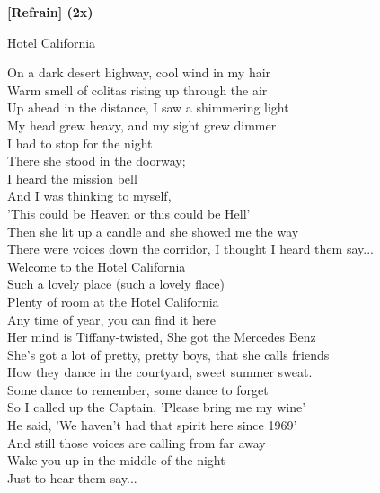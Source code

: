 \documentclass{novel}
\begin{document}
{{\begin{minipage}[t][0.4\textheight][t]{\textwidth}
\begin{multicols}{2}
\textbf{[Refrain] (2x)}

\end{multicols}
\end{minipage}

\nointerlineskip
\begin{minipage}[b][0.55\textheight][t]{\textwidth}
\vspace{0.12\textheight}
\h*{Hotel California}

\begin{multicols}{2}
On a dark desert highway, cool wind in my hair\\
Warm smell of colitas rising up through the air\\
Up ahead in the distance, I saw a shimmering light\\
My head grew heavy, and my sight grew dimmer\\
I had to stop for the night\\
There she stood in the doorway;\\
I heard the mission bell\\
And I was thinking to myself,\\
'This could be Heaven or this could be Hell'\\
Then she lit up a candle and she showed me the way\\
There were voices down the corridor, I thought I heard them say...\\

Welcome to the Hotel California\\
Such a lovely place (such a lovely flace)\\
Plenty of room at the Hotel California\\
Any time of year, you can find it here\\

Her mind is Tiffany-twisted, She got the Mercedes Benz\\
She's got a lot of pretty, pretty boys, that she calls friends\\
How they dance in the courtyard, sweet summer sweat.\\
Some dance to remember, some dance to forget\\
So I called up the Captain, 'Please bring me my wine'\\
He said, 'We haven't had that spirit here since 1969'\\
And still those voices are calling from far away\\
Wake you up in the middle of the night\\
Just to hear them say...\\


\end{multicols}
\end{minipage}}}
\end{document}
